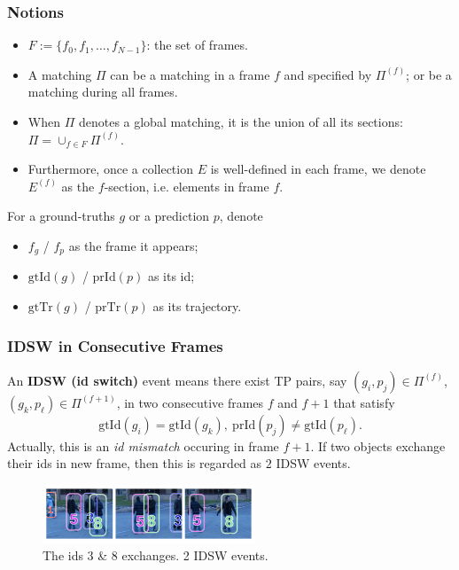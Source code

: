 \documentclass[slidetop, mathserif]{beamer}
\begin{document}
\begin{frame}
	\frametitle{Notions}
			
	\begin{itemize}
		\item $F:=\{f_0, f_1, \ldots, f_{N-1}\}$: the set of frames.
		\item A matching $\Pi$ can be a matching in a frame $f$ and specified by $\Pi^{(f)}$;
		      or be a matching during all frames.
		\item When $\Pi$ denotes a global matching, it is the union of all its sections:
		      $\Pi = \cup_{f\in F}\Pi^{(f)}$.
		\item Furthermore, once a collection $E$ is well-defined in each frame,
		      we denote $E^{(f)}$ as the $f$-section, i.e. elements in frame $f$.
		      		      		      
	\end{itemize}
			
	\vspace{-2pt}

	For a ground-truths $g$ or a prediction $p$, denote
	\begin{itemize}
		\item $f_g$ / $f_p$ as the frame it appears;
		\item $\text{gtId}(g)$ / $\text{prId}(p)$ as its id;
		\item $\text{gtTr}(g)$ / $\text{prTr}(p)$ as its trajectory.
	\end{itemize}

\end{frame}

\begin{frame}
	\frametitle{IDSW in Consecutive Frames}
			
	An {\bf IDSW (id switch)} event means there exist TP pairs, say $(g_i, p_j)\in\Pi^{(f)}$,
	$(g_k, p_\ell)\in\Pi^{(f+1)}$, in two consecutive frames
	$f$ and $f+1$ that satisfy
	\[
		\text{gtId}(g_i) = \text{gtId}(g_k),\ 
		\text{prId}(p_j) \neq \text{gtId}(p_\ell).
	\]
	Actually, this is an \emph{id mismatch} occuring in frame $f+1$.
	If two objects exchange their ids in new frame, then this is regarded as $2$
	IDSW events.
	\begin{figure}
		\includegraphics[width=180pt]{pics/fig3.png}
		\caption{The ids 3 \& 8 exchanges. 2 IDSW events.}
	\end{figure}
			    
\end{frame}
\end{document}

